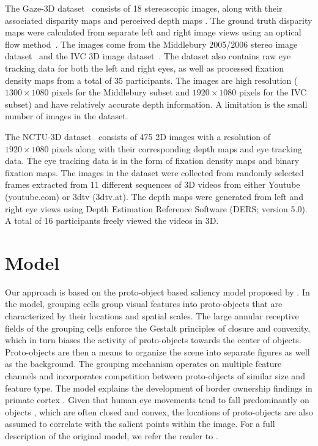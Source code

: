 The Gaze-3D dataset~\citep{Wang_etal13} consists of 18 stereoscopic
images, along with their associated disparity maps and perceived depth maps \cite[perceived depth is computed from raw disparity by taking into account viewing distance and display properties; see][for details]{Wang_etal13}. The ground truth disparity maps were calculated
from separate left and right image views using an optical flow method~\citep{Werlberger_etal09}. The images come from the Middlebury
2005/2006 stereo image dataset~\citep{Scharstein_Pal07} and the IVC 3D image dataset~\citep{Urvoy_etal12}. The dataset also contains raw eye tracking data for both the left and right eyes, as well as processed fixation density maps from a total of 35 participants. The images are high resolution ($1300\times1080$ pixels for the Middlebury subset and $1920\times1080$ pixels for the IVC subset) and have relatively accurate depth information. A limitation is the small number of images
in the dataset.

The NCTU-3D dataset~\citep{Ma_Hang15} consists of 475 2D images with a resolution of $1920\times1080$ pixels along with their corresponding depth maps and eye tracking data. The eye tracking data is in the form of fixation density maps and binary fixation maps. The images in the dataset were collected from randomly selected frames extracted from 11 different sequences of 3D videos from either Youtube (youtube.com) or 3dtv (3dtv.at). The depth maps were generated from left and right eye views using Depth Estimation Reference Software (DERS; version 5.0). A total of 16 participants freely viewed the videos in 3D.

\section{Model}
Our approach is based on the proto-object based saliency model proposed by \cite{Russell_etal14}. In the model, grouping cells group visual features into proto-objects that are characterized by their locations and spatial scales. The large annular receptive fields of the grouping cells enforce the Gestalt principles of closure and convexity, which in turn biases the activity of proto-objects towards the center of objects. Proto-objects are then a means to organize the scene into separate figures as well as the background. The grouping mechanism operates on multiple feature channels and incorporates competition between proto-objects of similar size and feature type. The model explains the development of border ownership findings in primate cortex \citep{Craft_etal07,Zhou_etal00}. Given that human eye movements tend to fall predominantly on objects \citep[][ but see \cite{Borji_etal13} for a different view]{Einhauser_etal08a}, which are often closed and convex, the locations of proto-objects are also assumed to correlate with the salient points within the image. For a full description of the original model, we refer the reader to \cite{Russell_etal14}.

